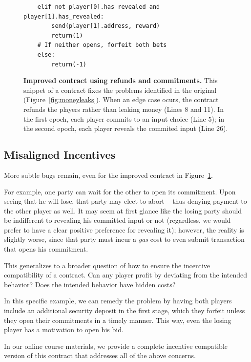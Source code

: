 \documentclass[10pt,twocolumn,letterpaper]{article}
\newcommand{\anote}[1]{{\color{magenta}{[AM: #1]}}}
\begin{document}
\begin{figure}
\begin{minipage}{\columnwidth}
\begin{mdframed}
\begin{verbatim}
	elif not player[0].has_revealed and player[1].has_revealed:
		send(player[1].address, reward)
		return(1)
	# If neither opens, forfeit both bets
	else:
		return(-1)
\end{verbatim}
\end{mdframed}
\end{minipage}%
%
\caption{
\label{fig:nocrypto}
{\bf Improved contract using refunds and commitments.} This snippet of a contract fixes the problems identified in the original (Figure~\ref{fig:moneyleaks}). When an edge case ocurs, the contract refunds the players rather than leaking money (Lines 8 and 11). In the first epoch, each player commits to an input choice (Line 5); in the second epoch, each player reveals the commited input (Line 26).
}
\end{figure}

\subsection{Misaligned Incentives}
More subtle bugs remain, even for the improved contract in Figure~\ref{fig:nocrypto}.

For example, one party can 
wait for the other to open its commitment. Upon
seeing that he will lose, that party may elect
to abort -- thus denying payment
to the other player as well. 
It may seem at first glance like the losing party should be indifferent to revealing his committed input or not (regardless, we would prefer to have a clear positive preference for revealing it); however, the reality is slightly worse, since that party must incur a \emph{gas} cost to even submit transaction that opens his commitment.

This generalizes to a broader question of how to 
ensure the incentive compatibility of a contract.
Can any player profit by deviating from the intended behavior?
Does the intended behavior have hidden costs?

In this specific example, we can remedy the problem
by having both players include an additional security deposit in the first stage,
which they forfeit unless they open their commitments in a timely manner.
This way, even the losing player has a motivation to open his bid.

In our online course materials, we provide a complete incentive compatible version of this contract that addresses all of the above concerns.\anote{CITE}
\end{document}
